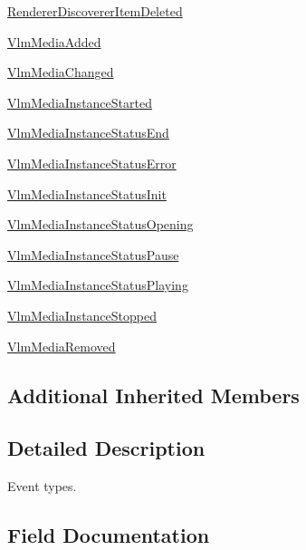 \begin{DoxyCompactItemize}
\item 
\hyperlink{classvlc_1_1_event_type_a5a299e7f1336a7b8cf7b57a3303a3c55}{Renderer\+Discoverer\+Item\+Deleted}
\item 
\hyperlink{classvlc_1_1_event_type_accb585f07087093624e776ae7a9a725a}{Vlm\+Media\+Added}
\item 
\hyperlink{classvlc_1_1_event_type_a0424bfca1fd0fd6c75e4459d1f855a9e}{Vlm\+Media\+Changed}
\item 
\hyperlink{classvlc_1_1_event_type_a4de4fe41fd3200df892db23f3386a2ea}{Vlm\+Media\+Instance\+Started}
\item 
\hyperlink{classvlc_1_1_event_type_a89ea4766f5fa281ccd6086e93ca63632}{Vlm\+Media\+Instance\+Status\+End}
\item 
\hyperlink{classvlc_1_1_event_type_aa07a7036e9f79ee0b14a814115561078}{Vlm\+Media\+Instance\+Status\+Error}
\item 
\hyperlink{classvlc_1_1_event_type_add2966a644de5397bf9c046f131dc4c6}{Vlm\+Media\+Instance\+Status\+Init}
\item 
\hyperlink{classvlc_1_1_event_type_a8ff5c88d4d67d60516a766d4c7c87086}{Vlm\+Media\+Instance\+Status\+Opening}
\item 
\hyperlink{classvlc_1_1_event_type_a029d9188ca4bb63756f5f4b5b16b9f67}{Vlm\+Media\+Instance\+Status\+Pause}
\item 
\hyperlink{classvlc_1_1_event_type_ab2ab46fac43e3fe5b73e697f62469dde}{Vlm\+Media\+Instance\+Status\+Playing}
\item 
\hyperlink{classvlc_1_1_event_type_ad06fa10d08aba7cc99001d3a00c4f64d}{Vlm\+Media\+Instance\+Stopped}
\item 
\hyperlink{classvlc_1_1_event_type_af2709a988757b234ffb8fe4d2cb536d1}{Vlm\+Media\+Removed}
\end{DoxyCompactItemize}
\subsection*{Additional Inherited Members}


\subsection{Detailed Description}
\begin{DoxyVerb}Event types.
\end{DoxyVerb}
 

\subsection{Field Documentation}
\mbox{\label{classvlc_1_1_event_type_a55b3401d66f9de6982902c2305702e5d}} 

